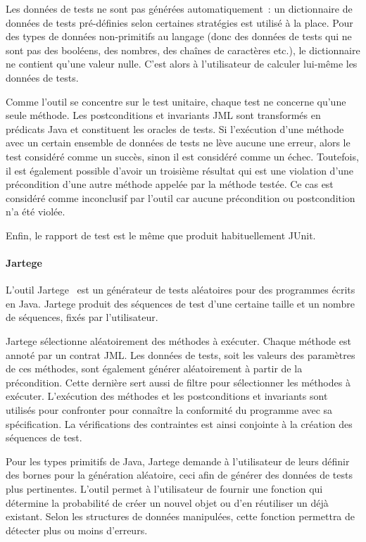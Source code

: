 Les données de tests ne sont pas générées automatiquement~: un dictionnaire de
données de tests pré-définies selon certaines stratégies est utilisé à la place.
Pour des types de données non-primitifs au langage (donc des données de tests
qui ne sont pas des booléens, des nombres, des chaînes de caractères etc.), le
dictionnaire ne contient qu'une valeur nulle. C'est alors à l'utilisateur de
calculer lui-même les données de tests.

Comme l'outil se concentre sur le test unitaire, chaque test ne concerne qu'une
seule méthode. Les postconditions et invariants JML sont transformés en
prédicats Java et constituent les oracles de tests. Si l'exécution d'une méthode
avec un certain ensemble de données de tests ne lève aucune une erreur, alors le
test considéré comme un succès, sinon il est considéré comme un échec.
Toutefois, il est également possible d'avoir un troisième résultat qui est une
violation d'une précondition d'une autre méthode appelée par la méthode testée.
Ce cas est considéré comme inconclusif par l'outil car aucune précondition ou
postcondition n'a été violée.

Enfin, le rapport de test est le même que produit habituellement JUnit.

\paragraph{Jartege} L'outil Jartege~ est un générateur de tests
aléatoires pour des programmes écrits en Java. Jartege produit des séquences de
test d'une certaine taille et un nombre de séquences, fixés par
l'utilisateur.

Jartege sélectionne aléatoirement des méthodes à exécuter. Chaque méthode est
annoté par un contrat JML. Les données de tests, soit les valeurs des paramètres
de ces méthodes, sont également générer aléatoirement à partir de la
précondition. Cette dernière sert aussi de filtre pour sélectionner les méthodes
à exécuter. L'exécution des méthodes et les postconditions et invariants sont
utilisés pour confronter pour connaître la conformité du programme avec sa
spécification. La vérifications des contraintes est ainsi conjointe à la
création des séquences de test.

Pour les types primitifs de Java, Jartege demande à l'utilisateur de leurs
définir des bornes pour la génération aléatoire, ceci afin de générer des
données de tests plus pertinentes. L'outil permet à l'utilisateur de fournir une
fonction qui détermine la probabilité de créer un nouvel objet ou d'en
réutiliser un déjà existant. Selon les structures de données manipulées, cette
fonction permettra de détecter plus ou moins d'erreurs.

